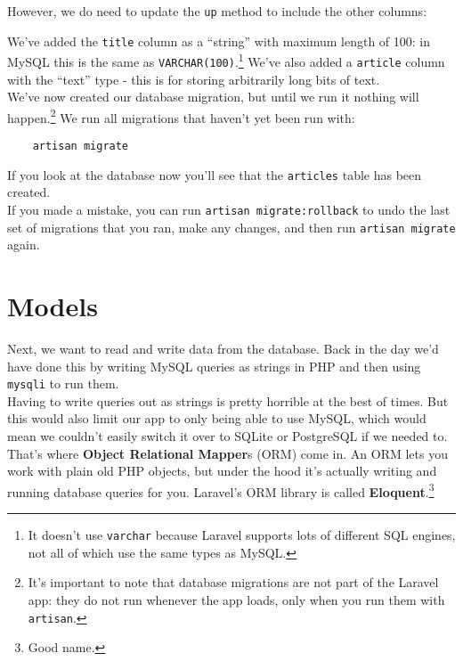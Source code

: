 However, we do need to update the \texttt{up} method to include the other columns:


We've added the \texttt{title} column as a ``string'' with maximum length of 100: in MySQL this is the same as \texttt{VARCHAR(100)}.\footnote{It doesn't use \texttt{varchar} because Laravel supports lots of different SQL engines, not all of which use the same types as MySQL.} We've also added a \texttt{article} column with the ``text'' type - this is for storing arbitrarily long bits of text.
\\

We've now created our database migration, but until we run it nothing will happen.\footnote{It's important to note that database migrations are not part of the Laravel app: they do not run whenever the app loads, only when you run them with \texttt{artisan}.} We run all migrations that haven't yet been run with:

\begin{verbatim}
    artisan migrate
\end{verbatim}

If you look at the database now you'll see that the \texttt{articles} table has been created.
\\

If you made a mistake, you can run \texttt{artisan migrate:rollback} to undo the last set of migrations that you ran, make any changes, and then run \texttt{artisan migrate} again.




\section{Models}

Next, we want to read and write data from the database. Back in the day we'd have done this by writing MySQL queries as strings in PHP and then using \texttt{mysqli} to run them.
\\

Having to write queries out as strings is pretty horrible at the best of times. But this would also limit our app to only being able to use MySQL, which would mean we couldn't easily switch it over to SQLite or PostgreSQL if we needed to.
\\

That's where \textbf{Object Relational Mapper}s (ORM) come in. An ORM lets you work with plain old PHP objects, but under the hood it's actually writing and running database queries for you. Laravel's ORM library is called \textbf{Eloquent}.\footnote{Good name.}

